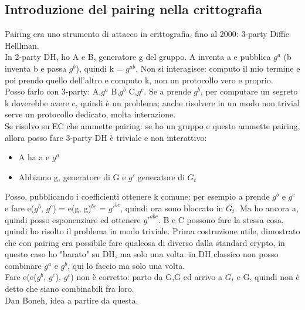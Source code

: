 \documentclass[16px]{article}
\begin{document}
\subsection{Introduzione del pairing nella crittografia}
Pairing era uno strumento di attacco in crittografia, fino al 2000: 3-party Diffie Helllman.\\ In 2-party DH, ho A e B, generatore g del gruppo. A inventa a e pubblica $g^a$ (b inventa b e passa $g^b$), quindi k = $g^{ab}$. Non si interagisce: computo il mio termine e poi prendo quello dell'altro e computo k, non un protocollo vero e proprio.\\ Posso farlo con 3-party: A,$g^a$ B,$g^b$ C,$g^c$. Se a prende $g^b$, per computare un segreto k doverebbe avere c, quindi è un problema; anche risolvere in un modo non trivial serve un protocollo dedicato, molta interazione.\\ Se risolvo su EC che ammette pairing: se ho un gruppo e questo ammette pairing, allora posso fare 3-party DH è triviale e non interattivo:
\begin{itemize}
\item A ha a e $g^a$
\item Abbiamo g, generatore di G e $g'$ generatore di $G_t$
\end{itemize}
Posso, pubblicando i coefficienti ottenere k comune: per esempio a prende $g^b$ e $g^c$ e fare e($g^b$, $g^c$) = e(g, g)$^{bc}$ = $g'^{bc}$, quindi ora sono bloccato in $G_t$. Ma ho ancora a, quindi posso esponenziare ed ottenere $g'^{abc}$. B e C possono fare la stessa cosa, quindi ho risolto il problema in modo triviale. Prima costruzione utile, dimostrato che con pairing era possibile fare qualcosa di diverso dalla standard crypto, in questo caso ho "barato" su DH, ma solo una volta: in DH classico non posso combinare $g^a$ e $g^b$, qui lo faccio ma solo una volta.\\ Fare e(e($g^b$, $g^c$), $g^c$) non è corretto: parto da G,G ed arrivo a $G_t$ e G, quindi non è detto che siano combinabili fra loro.\\ Dan Boneh, idea a partire da questa.
\end{document}
